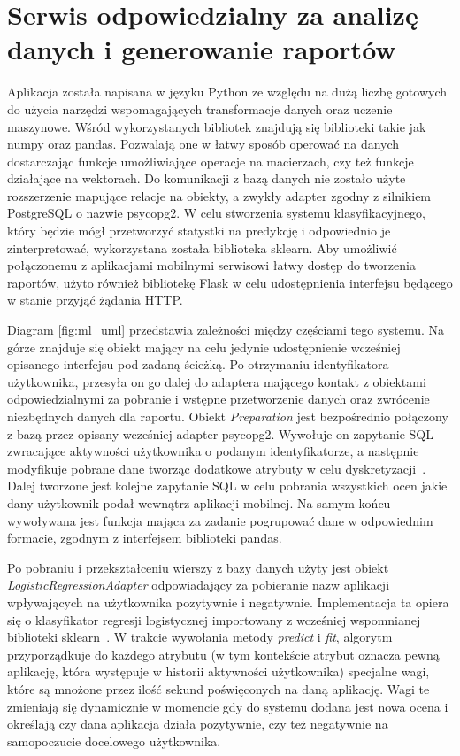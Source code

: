 \documentclass[a4paper,twoside,12pt]{book}
\begin{document}
\section{Serwis odpowiedzialny za analizę danych i generowanie raportów}
\label{python}
Aplikacja została napisana w języku Python ze względu na dużą liczbę gotowych do użycia narzędzi wspomagających transformacje danych oraz uczenie maszynowe. Wśród wykorzystanych bibliotek znajdują się biblioteki takie jak numpy oraz pandas. Pozwalają one w łatwy sposób operować na danych dostarczając funkcje umożliwiające operacje na macierzach, czy też funkcje działające na wektorach.
Do komunikacji z bazą danych nie zostało użyte rozszerzenie mapujące relacje na obiekty, a zwykły adapter zgodny z silnikiem PostgreSQL o nazwie psycopg2. W celu stworzenia systemu klasyfikacyjnego, który będzie mógł przetworzyć statystki na predykcję i odpowiednio je zinterpretować, wykorzystana została biblioteka sklearn. Aby umożliwić połączonemu z aplikacjami mobilnymi serwisowi łatwy dostęp do tworzenia raportów, użyto również bibliotekę Flask w celu udostępnienia interfejsu będącego w stanie przyjąć żądania HTTP. 

Diagram \ref{fig:ml_uml} przedstawia zależności między częściami tego systemu. Na górze znajduje się obiekt mający na celu jedynie udostępnienie wcześniej opisanego interfejsu pod zadaną ścieżką. Po otrzymaniu identyfikatora użytkownika, przesyła on go dalej do adaptera mającego kontakt z obiektami odpowiedzialnymi za pobranie i wstępne przetworzenie danych oraz zwrócenie niezbędnych danych dla raportu. Obiekt \textit{Preparation} jest bezpośrednio połączony z bazą przez opisany wcześniej adapter psycopg2. Wywołuje on zapytanie SQL zwracające aktywności użytkownika o podanym identyfikatorze, a następnie modyfikuje pobrane dane tworząc dodatkowe atrybuty w celu dyskretyzacji~\cite{discretization}. Dalej tworzone jest kolejne zapytanie SQL w celu pobrania wszystkich ocen jakie dany użytkownik podał wewnątrz aplikacji mobilnej. Na samym końcu wywoływana jest funkcja mająca za zadanie pogrupować dane w odpowiednim formacie, zgodnym z interfejsem biblioteki pandas. 

Po pobraniu i przekształceniu wierszy z bazy danych użyty jest obiekt \textit{LogisticRegressionAdapter} odpowiadający za pobieranie nazw aplikacji wpływających na użytkownika pozytywnie i negatywnie. Implementacja ta opiera się o klasyfikator regresji logistycznej importowany z wcześniej wspomnianej biblioteki sklearn~\cite{logistic_regression}. W trakcie wywołania metody \textit{predict} i \textit{fit}, algorytm przyporządkuje do każdego atrybutu (w tym kontekście atrybut oznacza pewną aplikację, która występuje w historii aktywności użytkownika) specjalne wagi, które są mnożone przez ilość sekund poświęconych na daną aplikację. Wagi te zmieniają się dynamicznie w momencie gdy do systemu dodana jest nowa ocena i określają czy dana aplikacja działa pozytywnie, czy też negatywnie na samopoczucie docelowego użytkownika.
\end{document}
